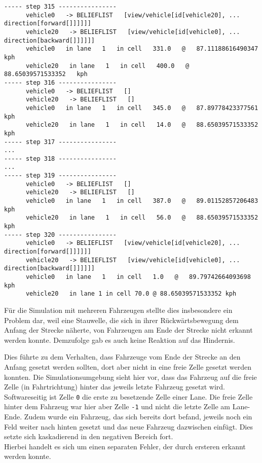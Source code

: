 \footnotesize\begin{verbatim}
----- step 315 ----------------
      vehicle0   -> BELIEFLIST   [view/vehicle[id[vehicle20], ... direction[forward[]]]]]]
      vehicle20   -> BELIEFLIST   [view/vehicle[id[vehicle0], ... direction[backward[]]]]]]
      vehicle0   in lane   1   in cell   331.0   @   87.11188616490347   kph
      vehicle20   in lane   1   in cell   400.0   @   88.65039571533352   kph
----- step 316 ----------------
      vehicle0   -> BELIEFLIST   []
      vehicle20   -> BELIEFLIST   []
      vehicle0   in lane   1   in cell   345.0   @   87.89778423377561   kph
      vehicle20   in lane   1   in cell   14.0   @   88.65039571533352   kph
----- step 317 ----------------
...
----- step 318 ----------------
...
----- step 319 ----------------
      vehicle0   -> BELIEFLIST   []
      vehicle20   -> BELIEFLIST   []
      vehicle0   in lane   1   in cell   387.0   @   89.01152857206483   kph
      vehicle20   in lane   1   in cell   56.0   @   88.65039571533352   kph
----- step 320 ----------------
      vehicle0   -> BELIEFLIST   [view/vehicle[id[vehicle20], ... direction[forward[]]]]]]
      vehicle20   -> BELIEFLIST   [view/vehicle[id[vehicle0], ... direction[backward[]]]]]]
      vehicle0   in lane   1   in cell   1.0   @   89.79742664093698   kph
      vehicle20   in lane 1 in cell 70.0 @ 88.65039571533352 kph
\end{verbatim}
\normalsize

Für die Simulation mit mehreren Fahrzeugen stellte dies insbesondere ein Problem dar, weil eine Stauwelle, die sich in ihrer Rückwärtsbewegung dem Anfang der Strecke näherte, von Fahrzeugen am Ende der Strecke nicht erkannt werden konnte.
Demzufolge gab es auch keine Reaktion auf das Hindernis.

Dies führte zu dem Verhalten, dass Fahrzeuge vom Ende der Strecke an den Anfang gesetzt werden sollten, dort aber nicht in eine freie Zelle gesetzt werden konnten.
Die Simulationsumgebung sieht hier vor, dass das Fahrzeug auf die freie Zelle (in Fahrtrichtung) hinter das jeweils letzte Fahrzeug gesetzt wird.
\\
Softwareseitig ist Zelle \texttt{0} die erste zu besetzende Zelle einer Lane. Die freie Zelle hinter dem Fahrzeug war hier aber Zelle \texttt{-1} und nicht die letzte Zelle am Lane-Ende.
Zudem wurde ein Fahrzeug, das sich bereits dort befand, jeweils noch ein Feld weiter nach hinten gesetzt und das neue Fahrzeug dazwischen einfügt.
Dies setzte sich kaskadierend in den negativen Bereich fort.
\\
Hierbei handelt es sich um einen separaten Fehler, der durch ersteren erkannt werden konnte.

